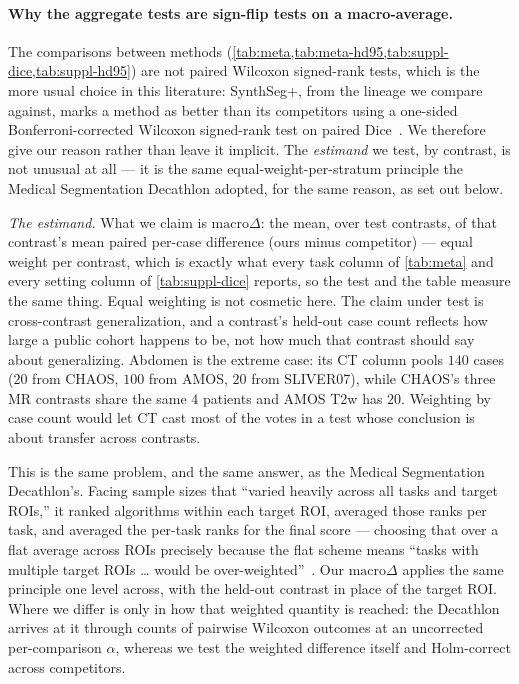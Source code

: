 \paragraph{Why the aggregate tests are sign-flip tests on a macro-average.}
The comparisons between methods (\cref{tab:meta,tab:meta-hd95,tab:suppl-dice,tab:suppl-hd95})
are not paired Wilcoxon signed-rank tests, which is the more usual choice in
this literature: SynthSeg+, from the lineage we compare against, marks a
method as better than its competitors using a one-sided Bonferroni-corrected
Wilcoxon signed-rank test on paired Dice~\cite{billot2023synthsegplus}. We
therefore give our reason rather than leave it implicit. The \emph{estimand}
we test, by contrast, is not unusual at all --- it is the same
equal-weight-per-stratum principle the Medical Segmentation Decathlon
adopted, for the same reason, as set out below.

\emph{The estimand.} What we claim is $\text{macro}\Delta$: the mean, over
test contrasts, of that contrast's mean paired per-case difference
(ours minus competitor) --- equal weight per contrast, which is exactly what
every task column of \cref{tab:meta} and every setting column of
\cref{tab:suppl-dice} reports, so the test and the table measure the same
thing. Equal weighting is not cosmetic here. The claim
under test is cross-contrast generalization, and a contrast's held-out case
count reflects how large a public cohort happens to be, not how much that
contrast should say about generalizing. Abdomen is the extreme case: its CT
column pools $140$ cases ($20$ from CHAOS, $100$ from AMOS, $20$ from
SLIVER07), while CHAOS's three MR contrasts share the same $4$ patients and
AMOS T2w has $20$. Weighting by case count would let CT cast most of the votes
in a test whose conclusion is about transfer across contrasts.

This is the same problem, and the same answer, as the Medical Segmentation
Decathlon's. Facing sample sizes that ``varied heavily across all tasks and
target ROIs,'' it ranked algorithms within each target ROI, averaged those
ranks per task, and averaged the per-task ranks for the final score ---
choosing that over a flat average across ROIs precisely because the flat
scheme means ``tasks with multiple target ROIs \ldots{} would be
over-weighted''~\cite{antonelli2022decathlon}. Our $\text{macro}\Delta$
applies the same principle one level across, with the held-out contrast in
place of the target ROI. Where we differ is only in how that weighted
quantity is reached: the Decathlon arrives at it through counts of pairwise
Wilcoxon outcomes at an uncorrected per-comparison $\alpha$, whereas we test
the weighted difference itself and Holm-correct across competitors.

